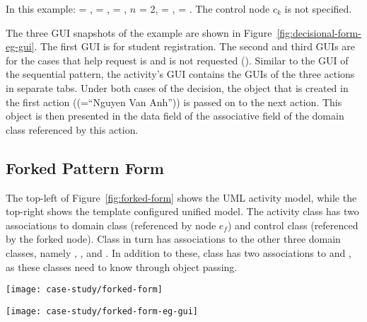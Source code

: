 In this example:  = ,  = ,  = , $ n $ = 2,  = ,  = .
The control node $ c_k $ is not specified.

The three GUI snapshots of the example are shown in Figure~\ref{fig:decisional-form-eg-gui}. The first GUI is for student registration. The second and third GUIs are for the cases that help request is and is not requested (\resp). Similar to the GUI of the sequential pattern, the activity's GUI contains the GUIs of the three actions in separate tabs. Under both cases of the decision, the  object that is created in the first action (\eg {}(=``Nguyen Van Anh'')) is passed on to the next action. This object is then presented in the data field of the associative field  of the domain class referenced by this action.

\subsection{Forked Pattern Form} \label{sect:forked-pattern}

The top-left of Figure~\ref{fig:forked-form} shows the UML activity model, while the top-right shows the template configured unified model. The activity class  has two associations to domain class  (referenced by node $ e_f $) and control class  (referenced by the forked node). Class  in turn has associations to the other three domain classes, namely , , and . In addition to these, class  has two associations to  and , as these classes need to know  through object passing.

\begin{figure*}[ht]
\begin{center}
\texttt{[image: case-study/forked-form]}
\end{center}
\caption{The forked pattern form.} %
\label{fig:forked-form}
\end{figure*}
%
\begin{figure*}[ht]
\begin{center}
\texttt{[image: case-study/forked-form-eg-gui]}
\end{center}
\caption{The forked pattern form view of enrolment management activity.} %
\label{fig:forked-form-eg-gui}
\end{figure*}

